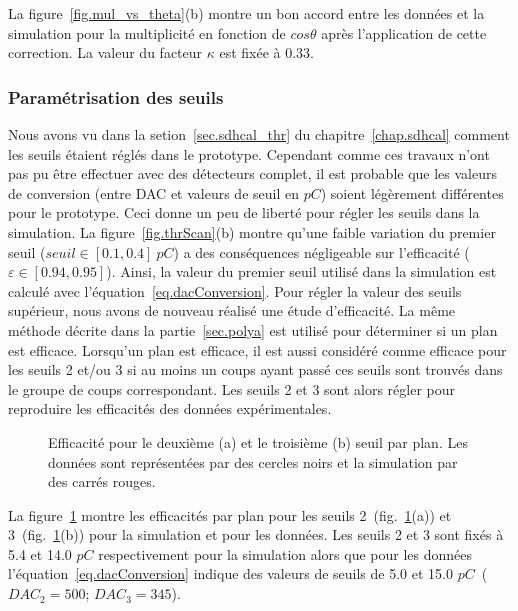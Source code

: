 La figure~\ref{fig.mul_vs_theta}(b) montre un bon accord entre les données et la simulation pour la multiplicité en fonction de $cos\theta$ après l'application de cette correction. La valeur du facteur $\kappa$ est fixée à 0.33.


\subsubsection{Paramétrisation des seuils}
Nous avons vu dans la setion~\ref{sec.sdhcal_thr} du chapitre~\ref{chap.sdhcal} comment les seuils étaient réglés dans le prototype. Cependant comme ces travaux n'ont pas pu être effectuer avec des détecteurs complet, il est probable que les valeurs de conversion (entre DAC et valeurs de seuil en $pC$) soient légèrement différentes pour le prototype. Ceci donne un peu de liberté pour régler les seuils dans la simulation. La figure~\ref{fig.thrScan}(b) montre qu'une faible variation du premier seuil ($seuil\in[0.1,0.4]~pC$) a des conséquences négligeable sur l'efficacité ($\varepsilon\in[0.94,0.95]$). Ainsi, la valeur du premier seuil utilisé dans la simulation est calculé avec l'équation~\ref{eq.dacConversion}. Pour régler la valeur des seuils supérieur, nous avons de nouveau réalisé une étude d'efficacité. La même méthode décrite dans la partie~\ref{sec.polya} est utilisé pour déterminer si un plan est efficace. Lorsqu'un plan est efficace, il est aussi considéré comme efficace pour les seuils 2 et/ou 3 si au moins un coups ayant passé ces seuils sont trouvés dans le groupe de coups correspondant. Les seuils 2 et 3 sont alors régler pour reproduire les efficacités des données expérimentales. 
\begin{figure}[!ht]
  \caption{Efficacité pour le deuxième (a) et le troisième (b) seuil par plan. Les données sont représentées par des cercles noirs et la simulation par des carrés rouges.\label{fig.eff_thr}}
\end{figure}
La figure~\ref{fig.eff_thr} montre les efficacités par plan pour les seuils 2~(fig.~\ref{fig.eff_thr}(a)) et 3~(fig.~\ref{fig.eff_thr}(b)) pour la simulation et pour les données. Les seuils 2 et 3 sont fixés à 5.4 et 14.0 $pC$ respectivement pour la simulation alors que pour les données l'équation~\ref{eq.dacConversion} indique des valeurs de seuils de 5.0 et 15.0 $pC$~($DAC_2=500$; $DAC_3=345$).

